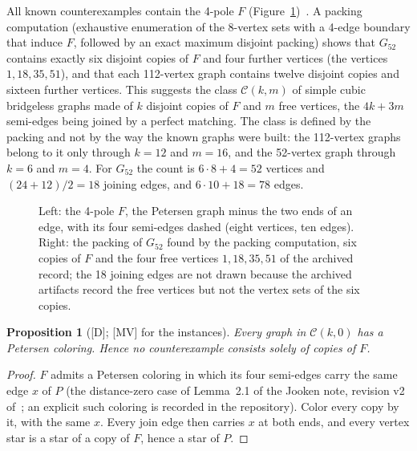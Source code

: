 \documentclass[11pt]{article}
\newtheorem{proposition}[theorem]{Proposition}
\theoremstyle{definition}
\theoremstyle{remark}
\newcommand{\PG}{P}
\newcommand{\Gfty}{G_{52}}
\newcommand{\mv}{\textup{[MV]}}
\newcommand{\dd}{\textup{[D]}}
\begin{document}
All known counterexamples contain the 4-pole $F$ (Figure~\ref{fig:fpole})~\cite{GJMMM2026}. A packing
computation (exhaustive enumeration of the 8-vertex sets with a 4-edge boundary that induce $F$, followed
by an exact maximum disjoint packing) shows that $\Gfty$ contains exactly six disjoint copies of $F$
and four further vertices (the vertices $1, 18, 35, 51$), and that each 112-vertex graph contains twelve
disjoint copies and sixteen further vertices. This suggests the class $\mathcal C(k, m)$ of simple cubic
bridgeless graphs made of $k$ disjoint copies of $F$ and $m$ free vertices, the $4k + 3m$ semi-edges
being joined by a perfect matching. The class is defined by the packing and not by the way the known
graphs were built: the 112-vertex graphs belong to it only through $k = 12$ and $m = 16$, and the
52-vertex graph through $k = 6$ and $m = 4$. For $\Gfty$ the count is $6 \cdot 8 + 4 = 52$ vertices and
$(24 + 12)/2 = 18$ joining edges, and $6 \cdot 10 + 18 = 78$ edges.

\begin{figure}[htbp]\centering
\hspace{1.2cm}
\caption{Left: the 4-pole $F$, the Petersen graph minus the two ends of an edge, with its four
semi-edges dashed (eight vertices, ten edges). Right: the packing of $\Gfty$ found by the packing
computation, six copies of $F$ and the four free vertices $1, 18, 35, 51$ of the archived record; the
18 joining edges are not drawn because the archived artifacts record the free vertices but not the
vertex sets of the six copies.}\label{fig:fpole}
\end{figure}

\begin{proposition}[\dd; \mv{} for the instances]\label{prop:pure}
Every graph in $\mathcal C(k, 0)$ has a Petersen coloring. Hence no counterexample consists
solely of copies of $F$.
\end{proposition}

\begin{proof}
$F$ admits a Petersen coloring in which its four semi-edges carry the same edge $x$ of $\PG$
(the distance-zero case of Lemma~2.1 of the Jooken note, revision v2 of~\cite{GJMMMU2026}; an explicit such coloring is
recorded in the repository). Color every copy by it, with the same $x$. Every join edge then
carries $x$ at both ends, and every vertex star is a star of a copy of $F$, hence a star of
$\PG$.
\end{proof}
\end{document}
